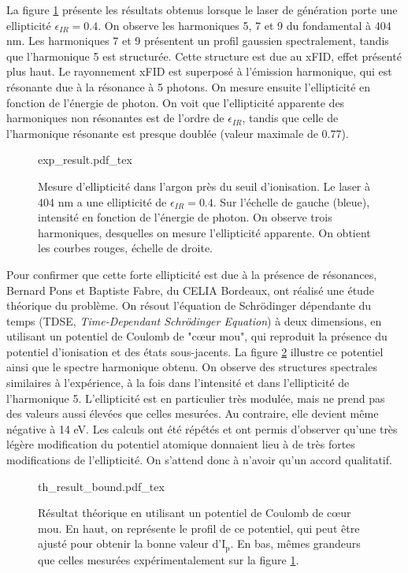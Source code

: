 La figure \ref{fig:resonant_argon_exp} présente les résultats obtenus lorsque le laser de génération porte une ellipticité $\epsilon_{IR} = 0.4$. On observe les harmoniques 5, 7 et 9 du fondamental à 404 nm. Les harmoniques 7 et 9 présentent un profil gaussien spectralement, tandis que l'harmonique 5 est structurée. Cette structure est due au xFID, effet présenté plus haut. Le rayonnement xFID est superposé à l'émission harmonique, qui est résonante due à la résonance à 5 photons.  On mesure ensuite l'ellipticité en fonction de l'énergie de photon. On voit que l'ellipticité apparente des harmoniques non résonantes est de l'ordre de $\epsilon_{IR}$, tandis que celle de l'harmonique résonante est presque doublée (valeur maximale de 0.77).  

\begin{figure}[!ht]
\centering
\def\svgwidth{1\columnwidth}
{exp_result.pdf_tex}
\caption{Mesure d'ellipticité dans l'argon près du seuil d'ionisation. Le laser à 404 nm a une ellipticité de $\epsilon_{IR}=0.4$. Sur l'échelle de gauche (bleue), intensité en fonction de l'énergie de photon. On observe trois harmoniques, desquelles on mesure l'ellipticité apparente. On obtient les courbes rouges, échelle de droite.}
\label{fig:resonant_argon_exp}
\end{figure}

Pour confirmer que cette forte ellipticité est due à la présence de résonances, Bernard Pons et Baptiste Fabre, du CELIA Bordeaux, ont réalisé une étude théorique du problème. On résout l'équation de Schrödinger dépendante du temps (TDSE, \textit{Time-Dependant Schrödinger Equation}) à deux dimensions, en utilisant un potentiel de Coulomb de "cœur mou", qui reproduit la présence du potentiel d'ionisation et des états sous-jacents. La figure \ref{fig:resonant_argon_th_bound} illustre ce potentiel ainsi que le spectre harmonique obtenu. On observe des structures spectrales similaires à l'expérience, à la fois dans l'intensité et dans l'ellipticité de l'harmonique 5. L'ellipticité est en particulier très modulée, mais ne prend pas des valeurs aussi élevées que celles mesurées. Au contraire, elle devient même négative à 14 eV. Les calculs ont été répétés et ont permis d'observer qu'une très légère modification du potentiel atomique donnaient lieu à de très fortes modifications de l'ellipticité. On s'attend donc à n'avoir qu'un accord qualitatif.

\begin{figure}[!ht]
\centering
\def\svgwidth{1\columnwidth}
{th_result_bound.pdf_tex}
\caption{Résultat théorique en utilisant un potentiel de Coulomb de cœur mou. En haut, on représente le profil de ce potentiel, qui peut être ajusté pour obtenir la bonne valeur d'$\text{I}_{\text{p}}$. En bas, mêmes grandeurs que celles mesurées expérimentalement sur la figure \ref{fig:resonant_argon_exp}.}
\label{fig:resonant_argon_th_bound}
\end{figure}

